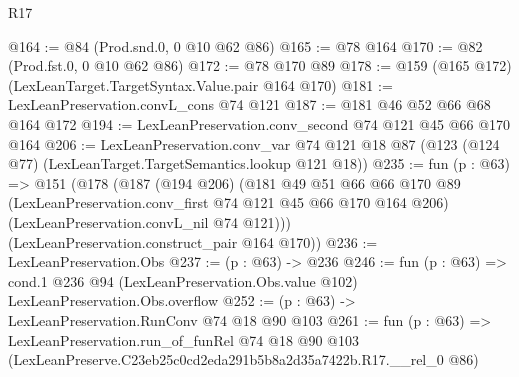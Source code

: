 \begin{lexlean}{R17}
\begin{coremodule}
@164 := @84 (Prod.snd.{0, 0} @10 @62 @86)
@165 := @78 @164
@170 := @82 (Prod.fst.{0, 0} @10 @62 @86)
@172 := @78 @170 @89
@178 := @159 (@165 @172) (LexLeanTarget.TargetSyntax.Value.pair @164 @170)
@181 := LexLeanPreservation.convL_cons @74 @121
@187 := @181 @46 @52 @66 @68 @164 @172
@194 := LexLeanPreservation.conv_second @74 @121 @45 @66 @170 @164
@206 := LexLeanPreservation.conv_var
    @74
    @121
    @18
    @87
    (@123 (@124 @77) (LexLeanTarget.TargetSemantics.lookup @121 @18))
@235 := fun (p : @63) =>
  @151
    (@178
      (@187
        (@194 @206)
        (@181
          @49
          @51
          @66
          @66
          @170
          @89
          (LexLeanPreservation.conv_first @74 @121 @45 @66 @170 @164 @206)
          (LexLeanPreservation.convL_nil @74 @121)))
      (LexLeanPreservation.construct_pair @164 @170))
@236 := LexLeanPreservation.Obs
@237 := (p : @63) -> @236
@246 := fun (p : @63) =>
  cond.{1} @236 @94 (LexLeanPreservation.Obs.value @102) LexLeanPreservation.Obs.overflow
@252 := (p : @63) -> LexLeanPreservation.RunConv @74 @18 @90 @103
@261 := fun (p : @63) =>
  LexLeanPreservation.run_of_funRel
    @74
    @18
    @90
    @103
    (LexLeanPreserve.C23eb25c0cd2eda291b5b8a2d35a7422b.R17.__rel_0 @86)
\end{coremodule}
\end{lexlean}
